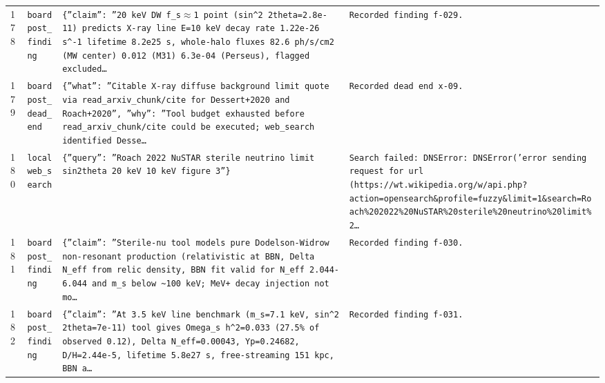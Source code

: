 \documentclass[11pt,a4paper]{article}
\begin{document}
\begin{longtable}{@{}p{}p{}p{}p{}@{}}
178 & \texttt{board}\newline\texttt{post\_\allowbreak{}finding} & \texttt{\{''claim'':\allowbreak{} ''20 keV DW f\_\allowbreak{}s$\approx$1 point (sin\textasciicircum{}\allowbreak{}2 2theta=\allowbreak{}2.8e-11)\allowbreak{} predicts X-ray line E=\allowbreak{}10 keV decay rate 1.22e-26 s\textasciicircum{}\allowbreak{}-1 lifetime 8.2e25 s,\allowbreak{} whole-halo fluxes 82.6 ph/\allowbreak{}s/\allowbreak{}cm2 (MW center)\allowbreak{} 0.012 (M31)\allowbreak{} 6.3e-04 (Perseus)\allowbreak{},\allowbreak{} flagged excluded\ldots{}\allowbreak{}} & \texttt{Recorded finding f-029.} \\
179 & \texttt{board}\newline\texttt{post\_\allowbreak{}dead\_\allowbreak{}end} & \texttt{\{''what'':\allowbreak{} ''Citable X-ray diffuse background limit quote via read\_\allowbreak{}arxiv\_\allowbreak{}chunk/\allowbreak{}cite for Dessert+2020 and Roach+2020'',\allowbreak{} ''why'':\allowbreak{} ''Tool budget exhausted before read\_\allowbreak{}arxiv\_\allowbreak{}chunk/\allowbreak{}cite could be executed;\allowbreak{} web\_\allowbreak{}search identified Desse\ldots{}\allowbreak{}} & \texttt{Recorded dead end x-09.} \\
180 & \texttt{local}\newline\texttt{web\_\allowbreak{}search} & \texttt{\{''query'':\allowbreak{} ''Roach 2022 NuSTAR sterile neutrino limit sin2theta 20 keV 10 keV figure 3''\}\allowbreak{}} & \texttt{Search failed:\allowbreak{} DNSError:\allowbreak{} DNSError('error sending request for url (https:\allowbreak{}/\allowbreak{}/\allowbreak{}wt.wikipedia.org/\allowbreak{}w/\allowbreak{}api.php?action=\allowbreak{}opensearch\&profile=\allowbreak{}fuzzy\&limit=\allowbreak{}1\&search=\allowbreak{}Roach\%202022\%20NuSTAR\%20sterile\%20neutrino\%20limit\%2\ldots{}\allowbreak{}} \\
181 & \texttt{board}\newline\texttt{post\_\allowbreak{}finding} & \texttt{\{''claim'':\allowbreak{} ''Sterile-nu tool models pure Dodelson-Widrow non-resonant production (relativistic at BBN,\allowbreak{} Delta N\_\allowbreak{}eff from relic density,\allowbreak{} BBN fit valid for N\_\allowbreak{}eff 2.044-6.044 and m\_\allowbreak{}s below \textasciitilde{}\allowbreak{}100 keV;\allowbreak{} MeV+ decay injection not mo\ldots{}\allowbreak{}} & \texttt{Recorded finding f-030.} \\
182 & \texttt{board}\newline\texttt{post\_\allowbreak{}finding} & \texttt{\{''claim'':\allowbreak{} ''At 3.5 keV line benchmark (m\_\allowbreak{}s=\allowbreak{}7.1 keV,\allowbreak{} sin\textasciicircum{}\allowbreak{}2 2theta=\allowbreak{}7e-11)\allowbreak{} tool gives Omega\_\allowbreak{}s h\textasciicircum{}\allowbreak{}2=\allowbreak{}0.033 (27.5\% of observed 0.12)\allowbreak{},\allowbreak{} Delta N\_\allowbreak{}eff=\allowbreak{}0.00043,\allowbreak{} Yp=\allowbreak{}0.24682,\allowbreak{} D/\allowbreak{}H=\allowbreak{}2.44e-5,\allowbreak{} lifetime 5.8e27 s,\allowbreak{} free-streaming 151 kpc,\allowbreak{} BBN a\ldots{}\allowbreak{}} & \texttt{Recorded finding f-031.} \\

\end{longtable}
\end{document}
